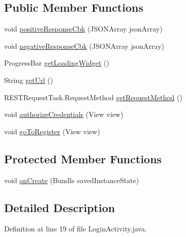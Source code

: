 \subsection*{Public Member Functions}
\begin{DoxyCompactItemize}
\item 
void \hyperlink{classcom_1_1bartekcios_1_1ticketsclient_1_1_login_activity_a0d61bd01e94ea4593cd584a3950b8249}{positive\+Response\+Cbk} (J\+S\+O\+N\+Array json\+Array)
\item 
void \hyperlink{classcom_1_1bartekcios_1_1ticketsclient_1_1_login_activity_a3527aa5a562d3ab3fcfc34e484585808}{negative\+Response\+Cbk} (J\+S\+O\+N\+Array json\+Array)
\item 
Progress\+Bar \hyperlink{classcom_1_1bartekcios_1_1ticketsclient_1_1_login_activity_a86e8b2d53263f0523545c55c65643ea5}{get\+Loading\+Widget} ()
\item 
String \hyperlink{classcom_1_1bartekcios_1_1ticketsclient_1_1_login_activity_aaad16b575d23587ea31865662633e12f}{get\+Url} ()
\item 
R\+E\+S\+T\+Request\+Task.\+Request\+Method \hyperlink{classcom_1_1bartekcios_1_1ticketsclient_1_1_login_activity_ad31cbc5bfa2545d0795451f6243b8d56}{get\+Request\+Method} ()
\item 
void \hyperlink{classcom_1_1bartekcios_1_1ticketsclient_1_1_login_activity_ade24fad61c53e1be78a6270747a9943b}{authorize\+Credentials} (View view)
\item 
void \hyperlink{classcom_1_1bartekcios_1_1ticketsclient_1_1_login_activity_a2c9dc48d08c0f009f72bfbdce2f64dee}{go\+To\+Register} (View view)
\end{DoxyCompactItemize}
\subsection*{Protected Member Functions}
\begin{DoxyCompactItemize}
\item 
void \hyperlink{classcom_1_1bartekcios_1_1ticketsclient_1_1_login_activity_aa345d3a8f68d1cc80f2db6cde2f1627e}{on\+Create} (Bundle saved\+Instance\+State)
\end{DoxyCompactItemize}


\subsection{Detailed Description}


Definition at line 19 of file Login\+Activity.\+java.




